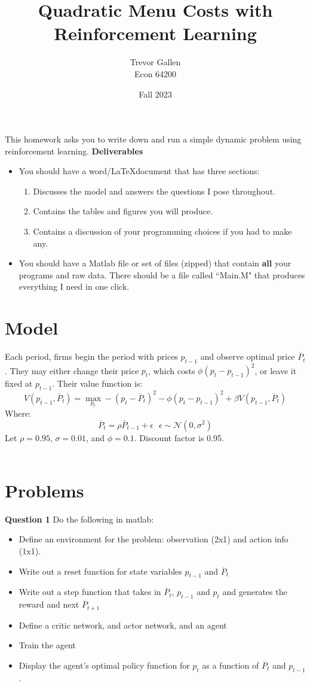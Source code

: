 \documentclass[11pt]{article}
\title{Quadratic Menu Costs with Reinforcement Learning  }
\author{ Trevor Gallen \\ Econ 64200 }
\date{Fall 2023}
\begin{document}


\maketitle

This homework asks you to write down and run a simple dynamic problem using reinforcement learning.
\textbf{Deliverables}
\begin{itemize}
\item You should have a word/\LaTeX document that has three sections: 
\begin{enumerate}
\item Discusses the model and answers the questions I pose throughout.
\item Contains the tables and figures you will produce.
\item Contains a discussion of your programming choices if you had to make any.
\end{enumerate}
\item You should have a Matlab file or set of files (zipped) that contain \textbf{all} your programs and raw data.  There should be a file called ``Main.M" that produces everything I need in one click.
\end{itemize}


\section{Model}
Each period, firms begin the period with prices $p_{t-1}$ and observe optimal price $\overline{P}_t$.  They may either change their price $p_t$, which costs $\phi(p_{t}-p_{t-1})^2$, or leave it fixed at $p_{t-1}$.  Their value function is:
$$V(p_{t-1},\overline{P}_t)=\underset{p_t}{\max} -(p_t-\overline{P}_t)^2-\phi(p_{t}-p_{t-1})^2+\beta V(p_{t-1},\overline{P}_t)$$
Where:
$$\overline{P}_t=\rho \overline{P}_{t-1}+\epsilon\ \ \ \epsilon\sim\mathcal{N}\left(0,\sigma^2\right)$$
Let $\rho=0.95$, $\sigma=0.01$, and $\phi=0.1$.  Discount factor is 0.95.
\ \\
\ \\

\section{Problems}
\textbf{Question 1} Do the following in matlab:
\begin{itemize}
\item Define an environment for the problem: observation (2x1) and action info (1x1).
\item Write out a reset function for state variables $p_{t-1}$ and $\overline{P}_t$
\item Write out a step function that takes in $\overline{P}_t$, $p_{t-1}$ and $p_{t}$ and generates the reward and next  $\overline{P}_{t+1}$
\item Define a critic network, and actor network, and an agent
\item Train the agent
\item Display the agent's optimal policy function for $p_t$ as a function of $\overline{P}_t$ and $p_{t-1}$.
\end{itemize}
 
\end{document}

